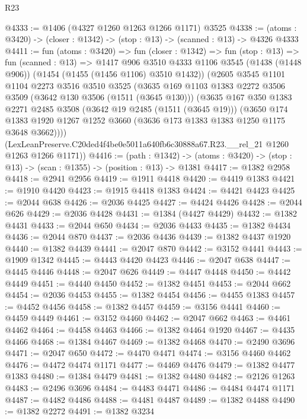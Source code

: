 \begin{lexlean}{R23}
\begin{coremodule}
@4333 := @1406 (@4327 @1260 @1263 @1266 @1171) @3525
@4338 := (atoms : @3420) -> (closer : @1342) -> (stop : @13) -> (scanned : @13) -> @4326 @4333
@4411 := fun (atoms : @3420) =>
  fun (closer : @1342) =>
  fun (stop : @13) =>
  fun (scanned : @13) =>
  @1417
    @906
    @3510
    @4333
    @1106
    @3545
    (@1438 (@1448 @906))
    (@1454 (@1455 (@1456 @1106) @3510 @1432))
    (@2605
      @3545
      @1101
      @1104
      @2273
      @3516
      @3510
      @3525
      (@3635
        @169
        @1103
        @1383
        @2272
        @3506
        @3509
        (@3642 @130 @3506 (@1511 (@3645 @130)))
        (@3635
          @167
          @350
          @1383
          @2271
          @2485
          @3508
          (@3642 @19 @2485 (@1511 (@3645 @19)))
          (@3650
            @174
            @1383
            @1920
            @1267
            @1252
            @3660
            (@3636 @173 @1383 @1383 @1250 @1175 @3648 @3662))))
      (LexLeanPreserve.C20ded4f4be0e5011a640fb6c30888a67.R23.__rel_21 @1260 @1263 @1266 @1171))
@4416 := (path : @1342) ->
  (atoms : @3420) -> (stop : @13) -> (scan : @1355) -> (position : @13) -> @1381
@4417 := @1382 @2958
@4418 := @2941 @2956
@4419 := @1911 @4418
@4420 := @4419 @1383
@4421 := @1910 @4420
@4423 := @1915 @4418 @1383
@4424 := @4421 @4423
@4425 := @2044 @638
@4426 := @2036 @4425
@4427 := @4424 @4426
@4428 := @2044 @626
@4429 := @2036 @4428
@4431 := @1384 (@4427 @4429)
@4432 := @1382 @4431
@4433 := @2044 @650
@4434 := @2036 @4433
@4435 := @1382 @4434
@4436 := @2044 @870
@4437 := @2036 @4436
@4439 := @1382 @4437 @1920
@4440 := @1382 @4439
@4441 := @2047 @870
@4442 := @3152 @4441
@4443 := @1909 @1342
@4445 := @4443 @4420 @4423
@4446 := @2047 @638
@4447 := @4445 @4446
@4448 := @2047 @626
@4449 := @4447 @4448
@4450 := @4442 @4449
@4451 := @4440 @4450
@4452 := @1382 @4451
@4453 := @2044 @662
@4454 := @2036 @4453
@4455 := @1382 @4454
@4456 := @4455 @1383
@4457 := @4452 @4456
@4458 := @1382 @4457
@4459 := @3156 @4441
@4460 := @4459 @4449
@4461 := @3152 @4460
@4462 := @2047 @662
@4463 := @4461 @4462
@4464 := @4458 @4463
@4466 := @1382 @4464 @1920
@4467 := @4435 @4466
@4468 := @1384 @4467
@4469 := @1382 @4468
@4470 := @2490 @3696
@4471 := @2047 @650
@4472 := @4470 @4471
@4474 := @3156 @4460 @4462
@4476 := @4472 @4474 @1171
@4477 := @4469 @4476
@4479 := @1382 @4477 @1383
@4480 := @1384 @4479
@4481 := @1382 @4480
@4482 := @2126 @1263
@4483 := @2496 @3696
@4484 := @4483 @4471
@4486 := @4484 @4474 @1171
@4487 := @4482 @4486
@4488 := @4481 @4487
@4489 := @1382 @4488
@4490 := @1382 @2272
@4491 := @1382 @3234

\end{coremodule}
\end{lexlean}
